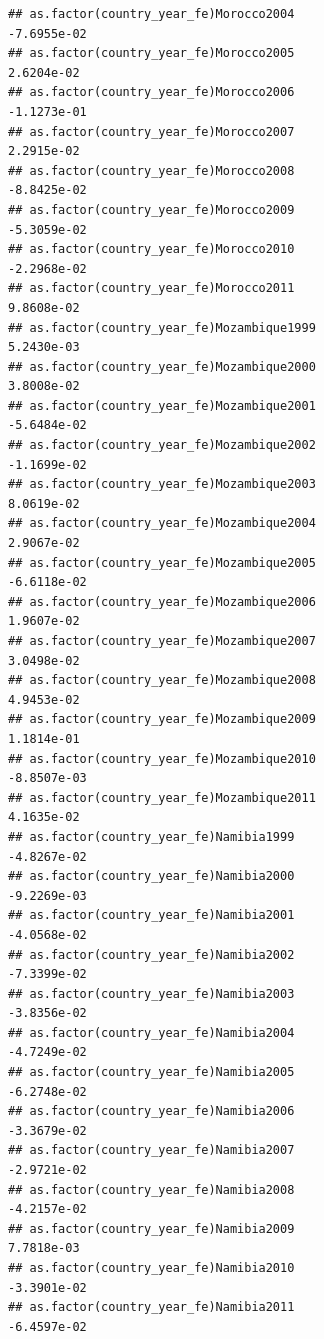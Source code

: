 \documentclass[
  a4paper,
]{article}
\begin{document}
\begin{verbatim}
## as.factor(country_year_fe)Morocco2004                          -7.6955e-02
## as.factor(country_year_fe)Morocco2005                           2.6204e-02
## as.factor(country_year_fe)Morocco2006                          -1.1273e-01
## as.factor(country_year_fe)Morocco2007                           2.2915e-02
## as.factor(country_year_fe)Morocco2008                          -8.8425e-02
## as.factor(country_year_fe)Morocco2009                          -5.3059e-02
## as.factor(country_year_fe)Morocco2010                          -2.2968e-02
## as.factor(country_year_fe)Morocco2011                           9.8608e-02
## as.factor(country_year_fe)Mozambique1999                        5.2430e-03
## as.factor(country_year_fe)Mozambique2000                        3.8008e-02
## as.factor(country_year_fe)Mozambique2001                       -5.6484e-02
## as.factor(country_year_fe)Mozambique2002                       -1.1699e-02
## as.factor(country_year_fe)Mozambique2003                        8.0619e-02
## as.factor(country_year_fe)Mozambique2004                        2.9067e-02
## as.factor(country_year_fe)Mozambique2005                       -6.6118e-02
## as.factor(country_year_fe)Mozambique2006                        1.9607e-02
## as.factor(country_year_fe)Mozambique2007                        3.0498e-02
## as.factor(country_year_fe)Mozambique2008                        4.9453e-02
## as.factor(country_year_fe)Mozambique2009                        1.1814e-01
## as.factor(country_year_fe)Mozambique2010                       -8.8507e-03
## as.factor(country_year_fe)Mozambique2011                        4.1635e-02
## as.factor(country_year_fe)Namibia1999                          -4.8267e-02
## as.factor(country_year_fe)Namibia2000                          -9.2269e-03
## as.factor(country_year_fe)Namibia2001                          -4.0568e-02
## as.factor(country_year_fe)Namibia2002                          -7.3399e-02
## as.factor(country_year_fe)Namibia2003                          -3.8356e-02
## as.factor(country_year_fe)Namibia2004                          -4.7249e-02
## as.factor(country_year_fe)Namibia2005                          -6.2748e-02
## as.factor(country_year_fe)Namibia2006                          -3.3679e-02
## as.factor(country_year_fe)Namibia2007                          -2.9721e-02
## as.factor(country_year_fe)Namibia2008                          -4.2157e-02
## as.factor(country_year_fe)Namibia2009                           7.7818e-03
## as.factor(country_year_fe)Namibia2010                          -3.3901e-02
## as.factor(country_year_fe)Namibia2011                          -6.4597e-02

\end{verbatim}
\end{document}
